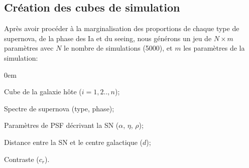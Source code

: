 \documentclass[../main/main.tex]{subfiles}
\begin{document}

\subsection{Création des cubes de simulation}

Après avoir procéder à la marginalisation des proportions de chaque type
de supernova, de la phase des Ia et du seeing, nous générons un jeu de
$N\times m$ paramètres avec $N$ le nombre de simulations (5000), et $m$
les paramètres de la simulation:\\

\begin{itemize}[label=$\diamondsuit$]
  \itemsep0em
 \begin{samepage}
\item Cube de la galaxie hôte ($i=1,2..,n$);
\item Spectre de supernova (type, phase);
\item Paramètres de PSF décrivant la SN ($\alpha$, $\eta$, $\rho$);
\item Distance entre la SN et le centre galactique ($d$);
\item  Contraste ($c_{r}$).
  \end{samepage}
\end{itemize}
\end{document}
